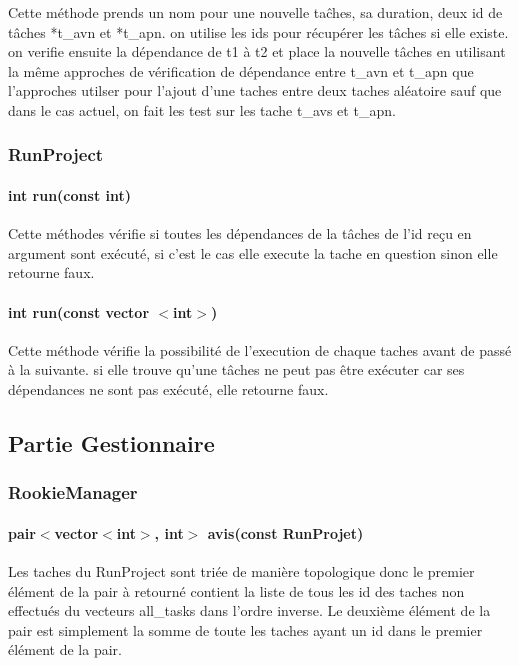 \documentclass[paper=a4, fontsize=11pt, frenchb, englishb]{article}
\begin{document}
Cette méthode prends un nom pour une nouvelle taĉhes, sa duration, deux id de tâches *t\_avn et *t\_apn. on utilise les ids pour récupérer les tâches si elle existe. on 
verifie ensuite la dépendance de t1 à t2 et place la nouvelle tâches en utilisant la même approches de vérification de dépendance entre t\_avn et t\_apn que l'approches 
utilser pour l'ajout d'une taches entre deux taches aléatoire sauf que dans le cas actuel, on fait les test sur les tache t\_avs et t\_apn.

			
			\subsubsection{RunProject}
			
				\paragraph{int run(const int)}
				
Cette méthodes vérifie si toutes les dépendances de la tâches de l'id reçu en argument sont exécuté, si c'est le cas elle execute la tache en question sinon elle retourne 
faux.
				
				\paragraph{int run(const vector $<$int$>$)}
				
Cette méthode vérifie la possibilité de l'execution de chaque taches avant de passé à la suivante. si elle trouve qu'une tâches ne peut pas être exécuter car ses 
dépendances ne sont pas exécuté, elle retourne faux.

		
		\subsection{Partie Gestionnaire}
		
			\subsubsection{RookieManager}
			
				\paragraph{pair$<$vector$<$int$>$, int$>$ avis(const RunProjet)}
				
Les taches du RunProject sont triée de manière topologique donc le premier élément de la pair à retourné contient la liste de tous les id des taches non effectués du vecteurs all\_tasks dans l'ordre inverse. Le deuxième élément de la pair est simplement la somme de toute les taches ayant un id dans le premier élément de la pair.
			
\end{document}
